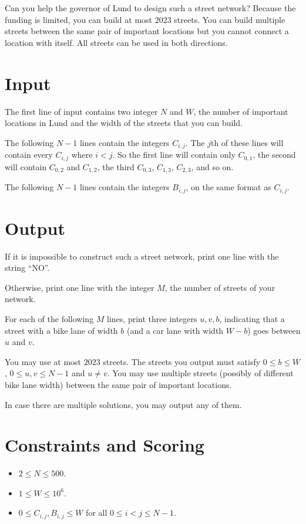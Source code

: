 Can you help the governor of Lund to design such a street network? 
Because the funding is limited, you can build at most $2023$ streets.
You can build multiple streets between the same pair of important locations but you cannot connect a location with itself.
All streets can be used in both directions.

\section*{Input}
The first line of input contains two integer $N$ and $W$, the number of important locations in Lund and the width of the streets that you can build.

The following $N-1$ lines contain the integers $C_{i,j}$. The $j$th of these lines will contain every
$C_{i,j}$ where $i < j$. So the first line will contain only $C_{0,1}$, the second will contain $C_{0,2}$
and $C_{1,2}$, the third $C_{0,3}$, $C_{1,3}$, $C_{2,3}$, and so on.

The following $N-1$ lines contain the integers $B_{i,j}$, on the same format as
$C_{i,j}$.

\section*{Output}

If it is impossible to construct such a street network, print one line with the string ``NO''.

Otherwise, print one line with the integer $M$, the number of streets of
your network.

For each of the following $M$ lines, print three integers $u, v, b$, indicating
that a street with a bike lane of width $b$ (and a car lane with width $W-b$) goes between $u$ and $v$.

You may use at most $2023$ streets. The streets you output must satisfy $0 \leq b \leq W$, $0\le u,v \le N-1$ and $u\neq v$. 
You may use multiple streets (possibly of different bike lane width) between the same pair of important locations.

In case there are multiple solutions, you may output any of them.

\section*{Constraints and Scoring}

\begin{itemize}
  \item $2 \le N \le 500$.
  \item $1 \le W \le 10^6$.
  \item $0 \le C_{i,j},B_{i,j}\le W$ for all $0 \le i < j \le N-1$.
\end{itemize}

